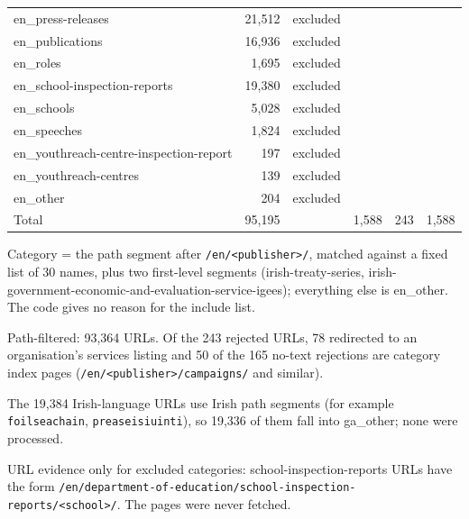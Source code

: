 \begin{table}[htbp]
\begin{threeparttable}
\begin{tabular}{lrlrrr}
en\_press-releases & 21,512 & excluded &  &  &  \\
en\_publications & 16,936 & excluded &  &  &  \\
en\_roles & 1,695 & excluded &  &  &  \\
en\_school-inspection-reports & 19,380 & excluded &  &  &  \\
en\_schools & 5,028 & excluded &  &  &  \\
en\_speeches & 1,824 & excluded &  &  &  \\
en\_youthreach-centre-inspection-report & 197 & excluded &  &  &  \\
en\_youthreach-centres & 139 & excluded &  &  &  \\
en\_other & 204 & excluded &  &  &  \\
\hline
Total & 95,195 &  & 1,588 & 243 & 1,588 \\
\hline
\end{tabular}
\begin{tablenotes}
\footnotesize
\item Category = the path segment after \texttt{/en/<publisher>/}, matched against a fixed list of 30 names, plus two first-level segments (irish-treaty-series, irish-government-economic-and-evaluation-service-igees); everything else is en\_other. The code gives no reason for the include list.
\item Path-filtered: 93,364 URLs. Of the 243 rejected URLs, 78 redirected to an organisation's services listing and 50 of the 165 no-text rejections are category index pages (\texttt{/en/<publisher>/campaigns/} and similar).
\item The 19,384 Irish-language URLs use Irish path segments (for example \texttt{foilseachain}, \texttt{preaseisiuinti}), so 19,336 of them fall into ga\_other; none were processed.
\item URL evidence only for excluded categories: school-inspection-reports URLs have the form \texttt{/en/department-of-education/school-inspection-reports/<school>/}. The pages were never fetched.
\end{tablenotes}
\end{threeparttable}
\end{table}
